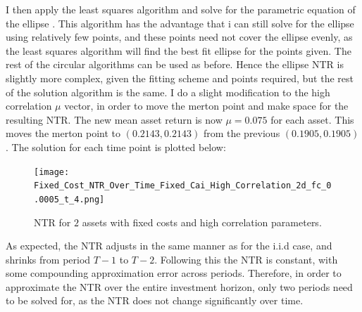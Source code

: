\documentclass[11pt]{article}
\begin{document}
I then apply the least squares algorithm and solve for the parametric equation of the ellipse \autocites{gander1994least}{bertoni2010multi}. This algorithm has the advantage that i can still solve for the ellipse using relatively few points,
and these points need not cover the ellipse evenly, as the least squares algorithm will find the best fit ellipse for the points given. 
The rest of the circular algorithms can be used as before. Hence the ellipse NTR is slightly more complex, given the fitting scheme and points required,
but the rest of the solution algorithm is the same. I do a slight modification to the high correlation $\mu$ vector, in order to move the merton point and make space for the resulting NTR.
The new mean asset return is now $\mu = 0.075$ for each asset. This moves the merton point to $(0.2143 , 0.2143)$ from the previous $(0.1905, 0.1905)$.
The solution for each time point is plotted below:
\begin{figure}[!ht]
    \centering
    \texttt{[image: Fixed\_Cost\_NTR\_Over\_Time\_Fixed\_Cai\_High\_Correlation\_2d\_fc\_0.0005\_t\_4.png]}
    \caption{NTR for $2$ assets with fixed costs and high correlation parameters.}
    \label{fig: NTR_Fixed_3d_high_correlation_over_time}
\end{figure}
As expected, the NTR adjusts in the same manner as for the i.i.d case, and shrinks from period $T-1$ to $T-2$. Following this the NTR is constant, with some compounding approximation error across periods.
Therefore, in order to approximate the NTR over the entire investment horizon, only two periods need to be solved for, as the NTR does not change significantly over time.
\end{document}
